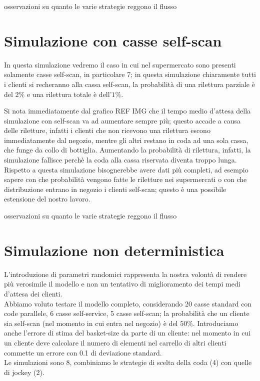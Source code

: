 
osservazioni su quanto le varie strategie reggono il flusso

\section{Simulazione con casse self-scan}

In questa simulazione vedremo il caso in cui nel supermercato sono presenti solamente casse self-scan, in particolare 7; in questa simulazione chiaramente tutti i clienti si recheranno alla cassa self-scan, la probabilità di una rilettura parziale è del $2\%$ e una rilettura totale è dell'$1\%$.


Si nota immediatamente dal grafico REF IMG che il tempo medio d'attesa della simulazione con self-scan va ad aumentare sempre più; questo accade a causa delle riletture, infatti i clienti che non ricevono una rilettura escono immediatamente dal negozio, mentre gli altri restano in coda ad una sola cassa, che funge da collo di bottiglia. Aumentando la probabilità di rilettura, infatti, la simulazione fallisce perchè la coda alla cassa riservata diventa troppo lunga. \\
Rispetto a questa simulazione bisognerebbe avere dati più completi, ad esempio sapere con che probabilità vengono fatte le riletture nei supermercati o con che distribuzione entrano in negozio i clienti self-scan; questo è una possibile estensione del nostro lavoro.


osservazioni su quanto le varie strategie reggono il flusso

\section{Simulazione non deterministica}

L'introduzione di parametri randomici rappresenta la nostra volontà di rendere più verosimile il modello e non un tentativo di miglioramento dei tempi medi d'attesa dei clienti. \\
Abbiamo voluto testare il modello completo, considerando 20 casse standard con code parallele, 6 casse self-service, 5 casse self-scan; la probabilità che un cliente sia self-scan (nel momento in cui entra nel negozio) è del $50\%$. Introduciamo anche l'errore di stima del basket-size da parte di un cliente: nel momento in cui un cliente deve calcolare il numero di elementi nel carrello di altri clienti commette un errore con 0.1 di deviazione standard. \\
Le simulazioni sono 8, combiniamo le strategie di scelta della coda (4) con quelle di jockey (2).

